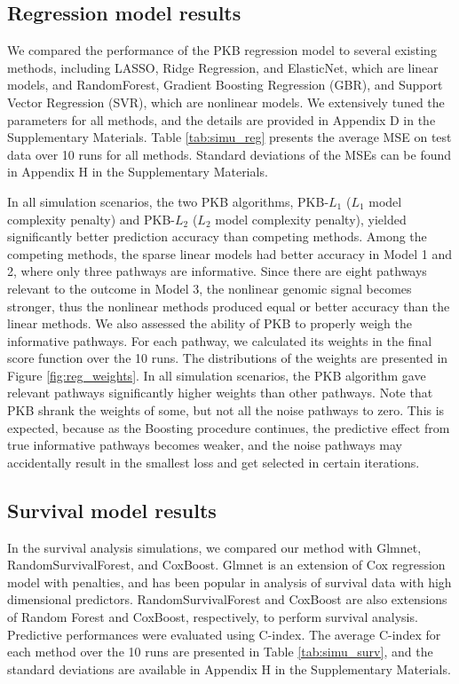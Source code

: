 \documentclass[a4paper,12pt]{article}
\begin{document}
\subsection{Regression model results}
We compared the performance of the PKB regression model to several existing methods, including LASSO,\cite{tibshirani1996regression} Ridge Regression,\cite{hoerl1970ridge} and ElasticNet, \citep{zou2005regularization} which are linear models, and RandomForest,\citep{breiman2001random} Gradient Boosting Regression (GBR), \citep{friedman2001greedy} and Support Vector Regression (SVR),\citep{smola2004tutorial} which are nonlinear models. We extensively tuned the parameters for all methods, and the details are provided in Appendix D in the Supplementary Materials. Table \ref{tab:simu_reg} presents the average MSE on test data over 10 runs for all methods. Standard deviations of the MSEs can be found in Appendix H in the Supplementary Materials.

In all simulation scenarios, the two PKB algorithms, PKB-$L_1$ ($L_1$ model complexity penalty) and PKB-$L_2$ ($L_2$ model complexity penalty), yielded significantly better prediction accuracy than competing methods. Among the competing methods, the sparse linear models had better accuracy in Model 1 and 2, where only three pathways are informative. Since there are eight pathways relevant to the outcome in Model 3, the nonlinear genomic signal becomes stronger, thus the nonlinear methods produced equal or better accuracy than the linear methods. We also assessed the ability of PKB to properly weigh the informative pathways. For each pathway, we calculated its weights in the final score function over the 10 runs. The distributions of the weights are presented in Figure \ref{fig:reg_weights}. In all simulation scenarios, the PKB algorithm gave relevant pathways significantly higher weights than other pathways. Note that PKB shrank the weights of some, but not all the noise pathways to zero. This is expected, because as the Boosting procedure continues, the predictive effect from true informative pathways becomes weaker, and the noise pathways may accidentally result in the smallest loss and get selected in certain iterations.

\subsection{Survival model results}
In the survival analysis simulations, we compared our method with Glmnet,\citep{simon2011regularization} RandomSurvivalForest, \citep{ishwaran2008random} and CoxBoost. \citep{binder2013coxboost} Glmnet is an extension of Cox regression model with penalties, and has been popular in analysis of survival data with high dimensional predictors. RandomSurvivalForest and CoxBoost are also extensions of Random Forest and CoxBoost, respectively,  to perform survival analysis. Predictive performances were evaluated using C-index. The average C-index for each method over the 10 runs are presented in Table \ref{tab:simu_surv}, and the standard deviations are available in Appendix H in the Supplementary Materials. 
\end{document}
